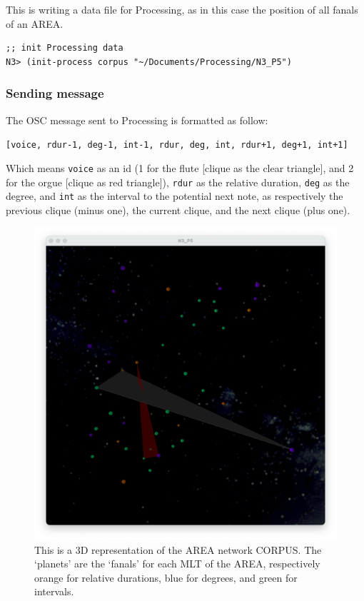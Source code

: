 \documentclass{article}
\begin{document}
This is writing a data file for Processing, as in this case the position of all fanals of an AREA. 
\begin{lstlisting}[language=N3]
;; init Processing data
N3> (init-process corpus "~/Documents/Processing/N3_P5")
\end{lstlisting}

\subsubsection{Sending message}

The OSC message sent to Processing is formatted as follow:

\smallskip

 \texttt{\small [voice, rdur-1, deg-1, int-1, rdur, deg, int, rdur+1, deg+1, int+1]}
 
 \smallskip
 
Which means \texttt{voice} as an id (1 for the flute [clique as the clear triangle], and 2 for the orgue [clique as red triangle]), \texttt{rdur} as the relative duration, \texttt{deg} as the degree, and \texttt{int} as the interval to the potential next note, as respectively the previous clique (minus one), the current clique, and the next clique (plus one).

\begin{figure}[h]
\centering
\includegraphics[width=\textwidth]{../img/9920}
\caption{This is a 3D representation of the AREA network CORPUS. The `planets' are the `fanals' for each MLT of the AREA, respectively orange for relative durations, blue for degrees, and green for intervals.}
\end{figure}
\end{document}
